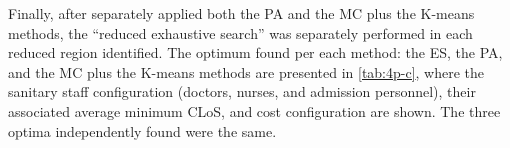 \documentclass[11pt]{article} %
\begin{document}
Finally, after separately applied both the PA and the MC plus the
K-means methods, the \textquotedblleft{}reduced exhaustive search\textquotedblright{}
was separately performed in each reduced region identified. The optimum
found per each method: the ES, the PA, and the MC plus the K-means
methods are presented in \ref{tab:4p-c}, where the sanitary staff
configuration (doctors, nurses, and admission personnel), their associated
average minimum CLoS, and cost configuration are shown. The three
optima independently found were the same. %

{} 
\end{document}
